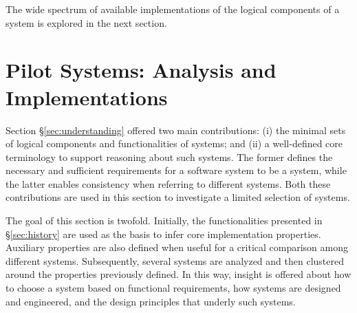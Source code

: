 \documentclass{sig-alternate}
\begin{document}

The wide spectrum of available implementations of the logical components of a
\pilot system is explored in the next section.


\section{Pilot Systems: Analysis and Implementations}
\label{sec:analysis}

Section \S\ref{sec:understanding} offered two main contributions: (i) the
minimal sets of logical components and functionalities of \pilot systems; and
(ii) a well-defined core terminology to support reasoning about such systems.
The former defines the necessary and sufficient requirements for a software
system to be a \pilot system, while the latter enables consistency when
referring to different \pilot systems. Both these contributions are used in this
section to investigate a limited selection of \pilot systems.


The goal of this section is twofold. Initially, the \pilot functionalities
presented in \S\ref{sec:history} are used as the basis to infer core \pilot
implementation properties. Auxiliary properties are also defined when useful
for a critical comparison among different \pilot systems. Subsequently, several
\pilot systems are analyzed and then clustered around the properties previously
defined. In this way, insight is offered about how to choose a \pilot system
based on functional requirements, how \pilot systems are designed and
engineered, and the design principles that underly such systems.

\end{document}
